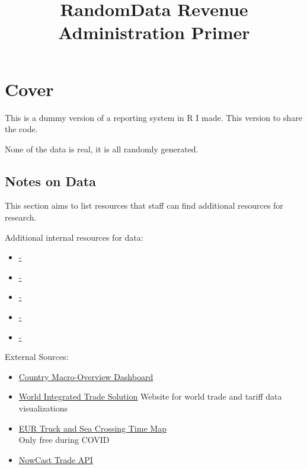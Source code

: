 \documentclass[
]{article}
\title{RandomData Revenue Administration Primer}
\author{}
\date{\vspace{-2.5em}}
\begin{document}
\maketitle

{
\setcounter{tocdepth}{2}
\tableofcontents
}
\newpage

\hypertarget{cover}{%
\section{Cover}\label{cover}}

This is a dummy version of a reporting system in R I made. This version
to share the code.

None of the data is real, it is all randomly generated.

\hypertarget{notes-on-data}{%
\subsection{Notes on Data}\label{notes-on-data}}

This section aims to list resources that staff can find additional
resources for research.

Additional internal resources for data:

\begin{itemize}
\item
  \href{}{-}
\item
  \href{}{-}
\item
  \href{}{-}
\item
  \href{}{-}
\item
  \href{}{-}
\end{itemize}

External Sources:

\begin{itemize}
\item
  \href{https://idea.usaid.gov/cd/albania/}{Country Macro-Overview
  Dashboard}
\item
  \href{https://wits.worldbank.org/Default.aspx?lang=en}{World
  Integrated Trade Solution} Website for world trade and tariff data
  visualizations
\item
  \href{https://live.sixfold.com/}{EUR Truck and Sea Crossing Time
  Map}\\
  Only free during COVID
\item
  \href{https://comtrade.un.org/Data/Doc/api/ex/r}{NowCast Trade API}
\end{itemize}

\newpage
\end{document}
